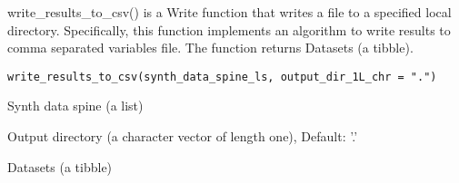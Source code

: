\documentclass[a4paper]{book}
\begin{document}
%
\begin{Description}\relax
write\_results\_to\_csv() is a Write function that writes a file to a specified local directory. Specifically, this function implements an algorithm to write results to comma separated variables file. The function returns Datasets (a tibble).
\end{Description}
%
\begin{Usage}
\begin{verbatim}
write_results_to_csv(synth_data_spine_ls, output_dir_1L_chr = ".")
\end{verbatim}
\end{Usage}
%
\begin{Arguments}
\begin{ldescription}
\item[\code{synth\_data\_spine\_ls}] Synth data spine (a list)

\item[\code{output\_dir\_1L\_chr}] Output directory (a character vector of length one), Default: '.'
\end{ldescription}
\end{Arguments}
%
\begin{Value}
Datasets (a tibble)
\end{Value}
\printindex{}
\end{document}
